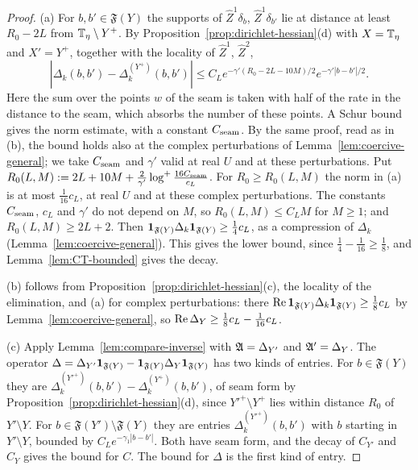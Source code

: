 \begin{proof}
(a) For $b,b'\in\mathfrak F(Y)$ the supports of $\hat Z^1\delta_b$, $\hat Z^1\delta_{b'}$ lie at distance at least $R_0-2L$ from $\mathbb T_\eta\setminus Y^+$. By Proposition~\ref{prop:dirichlet-hessian}(d) with $X=\mathbb T_\eta$ and $X'=Y^+$, together with the locality of $\hat Z^1$, $\hat Z^2$,
\[
|\Delta_k(b,b')-\Delta^{(Y^+)}_k(b,b')|\le C_Le^{-\gamma'(R_0-2L-10M)/2}e^{-\gamma'|b-b'|/2}.
\]
Here the sum over the points $w$ of the seam is taken with half of the rate in the distance to the seam, which absorbs the number of these points. A Schur bound gives the norm estimate, with a constant $C_{\rm seam}$. By the same proof, read as in (b), the bound holds also at the complex perturbations of Lemma~\ref{lem:coercive-general}; we take $C_{\rm seam}$ and $\gamma'$ valid at real $U$ and at these perturbations. Put $R_0(L,M):=2L+10M+\frac2{\gamma'}\log^+\frac{16C_{\rm seam}}{c_L}$. For $R_0\ge R_0(L,M)$ the norm in (a) is at most $\frac1{16}c_L$, at real $U$ and at these complex perturbations. The constants $C_{\rm seam}$, $c_L$ and $\gamma'$ do not depend on $M$, so $R_0(L,M)\le C_LM$ for $M\ge1$; and $R_0(L,M)\ge2L+2$. Then $\mathbf 1_{\mathfrak F(Y)}\Delta_k\mathbf 1_{\mathfrak F(Y)}\ge\frac14c_L$, as a compression of $\Delta_k$ (Lemma~\ref{lem:coercive-general}). This gives the lower bound, since $\frac14-\frac1{16}\ge\frac18$, and Lemma~\ref{lem:CT-bounded} gives the decay.

(b) follows from Proposition~\ref{prop:dirichlet-hessian}(c), the locality of the elimination, and (a) for complex perturbations: there $\operatorname{Re}\mathbf 1_{\mathfrak F(Y)}\Delta_k\mathbf 1_{\mathfrak F(Y)}\ge\frac18c_L$ by Lemma~\ref{lem:coercive-general}, so $\operatorname{Re}\Delta_Y\ge\frac18c_L-\frac1{16}c_L$.

(c) Apply Lemma~\ref{lem:compare-inverse} with $\mathfrak A=\Delta_{Y'}$ and $\mathfrak A'=\Delta_Y$. The operator $\Delta=\Delta_{Y'}\mathbf 1_{\mathfrak F(Y)}-\mathbf 1_{\mathfrak F(Y)}\Delta_Y\mathbf 1_{\mathfrak F(Y)}$ has two kinds of entries. For $b\in\mathfrak F(Y)$ they are $\Delta^{(Y'^+)}_k(b,b')-\Delta^{(Y^+)}_k(b,b')$, of seam form by Proposition~\ref{prop:dirichlet-hessian}(d), since $Y'^+\setminus Y^+$ lies within distance $R_0$ of $Y'\setminus Y$. For $b\in\mathfrak F(Y')\setminus\mathfrak F(Y)$ they are entries $\Delta^{(Y'^+)}_k(b,b')$ with $b$ starting in $Y'\setminus Y$, bounded by $C_Le^{-\gamma_1|b-b'|}$. Both have seam form, and the decay of $C_{Y'}$ and $C_Y$ gives the bound for $C$. The bound for $\Delta$ is the first kind of entry.
\end{proof}

